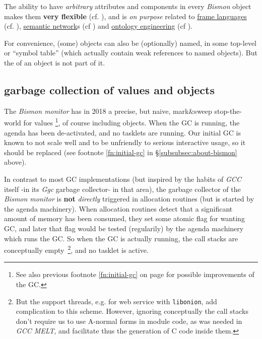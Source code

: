 The ability to have \emph{arbitrary} attributes and components in
every \emph{Bismon} object makes them \textbf{very flexible}
(cf. \cite{Lenat:1983:Eurisko, Lenat:1991:ev-cycl}), and is \emph{on purpose}
related to \href{https://en.wikipedia.org/wiki/Frame\_language}{frame
  languages} (cf. \cite{Bobrow-Winograd:1977:KRL}),
\href{https://en.wikipedia.org/wiki/Semantic\_network}{semantic
  network}s (cf \cite{VanDeRiet:1992:Ling-instr-know}) and
\href{https://en.wikipedia.org/wiki/Ontology\_engineering}{ontology
  engineering} (cf \cite{DeNicola:2009:OntologyBuilding}).

\medskip

For convenience, (some) objects can also be (optionally) named, in
some top-level  or ``symbol
table'' (which actually contain weak references to named objects). But
the  of an object is not part of it.

\bigskip

\subsection{garbage collection of values and objects}
\label{subsec:gcvalobj}

The \emph{Bismon monitor} has in 2018 a precise, but naive,
mark\&sweep stop-the-world  for values \footnote{See also previous footnote
  \ref{fn:initial-gc} on page \pageref{fn:initial-gc} for possible
  improvements of the GC.}, of course including objects. When the GC
is running, the agenda has been de-activated, and no tasklets are
running. Our initial GC is known to not scale well and to be
unfriendly to serious interactive usage, so it should be replaced (see
footnote \ref{fn:initial-gc} in \S\ref{subsubsec:about-bismon} above).

In contrast to most GC implementations (but inspired by the habits of
\emph{GCC} itself -in its \emph{Ggc} garbage collector- in that area),
the garbage collector of the \emph{Bismon monitor} is \textbf{not}
\emph{directly} triggered in allocation routines (but is started by
the agenda machinery). When allocation routines detect that a
significant amount of memory has been consumed, they set some atomic
flag for wanting GC, and later that flag would be tested (regularily)
by the agenda machinery which runs the GC.  So when the GC is actually
running, the call stacks are conceptually empty~\footnote{But the
  support threads, e.g. for web service with \texttt{libonion}, add
  complication to this scheme. However, ignoring conceptually the call
  stacks don't require us to use A-normal forms in module code, as was
  needed in \emph{GCC MELT}, and facilitate thus the generation of C
  code inside them.}, and no tasklet is active.


